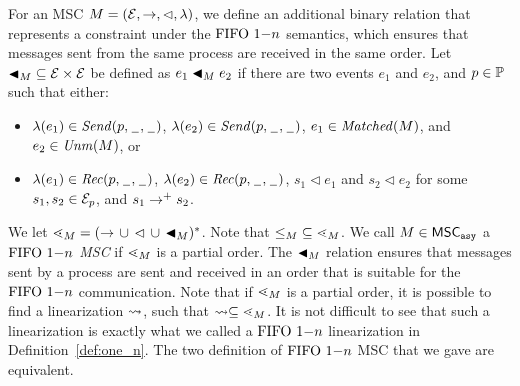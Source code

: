 \begin{definition} \label{def:one_n_alt}
	For an MSC $M = (\mathcal{E},\to,\lhd,\lambda)$, we define
	an additional binary relation that represents a constraint
	under the $\text{FIFO } 1\mathsf{-}n$ semantics, which ensures that messages sent from the same process are received in the same order. Let ${\blacktriangleleft}_M \subseteq \mathcal{E} \times \mathcal{E}$ be defined as $e_1 \blacktriangleleft_M e_2$ if there are two events $e_1$ and $e_2$, and $p \in \mathbb{P}$ such that either:
	\begin{itemize}\itemsep=0.5ex
		\item $\lambda(e_1) \in {\mathit{Send}(p,\hspace{0.1em}\underline{\hspace{0.5em}}\hspace{0.1em},\hspace{0.1em}\underline{\hspace{0.5em}}\hspace{0.1em})}$, $\lambda(e_2) \in {\mathit{Send}(p,\hspace{0.1em}\underline{\hspace{0.5em}}\hspace{0.1em},\hspace{0.1em}\underline{\hspace{0.5em}}\hspace{0.1em})}$, $e_1 \in \mathit{Matched}(M)$, and $e_2 \in \mathit{Unm}(M)$, or
		\item $\lambda(e_1) \in {\mathit{Rec}(p,\hspace{0.1em}\underline{\hspace{0.5em}}\hspace{0.1em},\hspace{0.1em}\underline{\hspace{0.5em}}\hspace{0.1em})}$, $\lambda(e_2) \in {\mathit{Rec}(p,\hspace{0.1em}\underline{\hspace{0.5em}}\hspace{0.1em},\hspace{0.1em}\underline{\hspace{0.5em}}\hspace{0.1em})}$, $s_1 \lhd e_1$ and $s_2 \lhd e_2$ for some $s_1,s_2 \in \mathcal{E}_p$, and $s_1 \to^+ s_2$.
	\end{itemize}
	
	We let ${\lessdot_M} = ({\to} \,\cup\, {\lhd} \,\cup\, {\blacktriangleleft_M})^\ast$.
	Note that ${\le_M} \subseteq {\lessdot_M}$.
	We call $M \in \mathsf{MSC}_{\mathtt{asy}}$ a \emph{$\text{FIFO } 1\mathsf{-}n$ MSC}
	if ${\lessdot_M}$ is a partial order. The ${\blacktriangleleft}_M$ relation ensures that messages sent by a process are sent and received in an order that is suitable for the $\text{FIFO } 1\mathsf{-}n$ communication. Note that if ${\lessdot_M}$ is a partial order, it is possible to find a linearization $\rightsquigarrow$, such that $\rightsquigarrow \subseteq \lessdot_M$. It is not difficult to see that such a linearization is exactly what we called a $\text{FIFO } 1\mathsf{-}n$ linearization in Definition~\ref{def:one_n}. The two definition of $\text{FIFO } 1\mathsf{-}n$ MSC that we gave are equivalent.
\end{definition}


